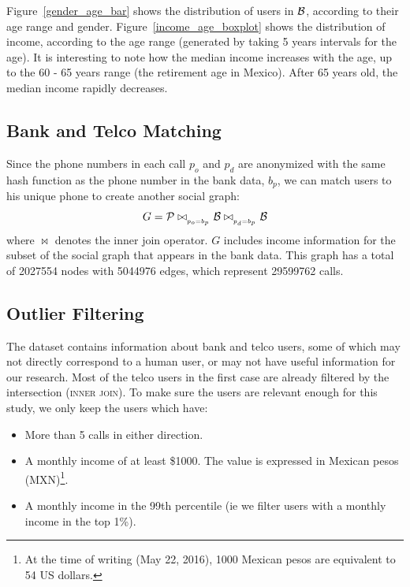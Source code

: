 Figure~\ref{gender_age_bar} shows the distribution of users in $\mathcal{B}$, according to
their age range and gender.
Figure~\ref{income_age_boxplot} shows the distribution of income, according to the age range (generated by taking 5 years intervals for the age).
It is interesting to note how the median income increases with the age, up to 
the 60 - 65 years range (the retirement age in Mexico). After 65 years old, the median income rapidly decreases.


\subsection{Bank and Telco Matching}

Since the phone numbers in each call $ p_o $ and $ p_d $ are anonymized with the same hash function as the phone number in the bank data, $ b_p $, we can match users to his unique phone to create another social graph: 
$$ G = \mathcal{P} \bowtie_{_{p_o = b_p}} \mathcal{B} \bowtie_{_{p_d = b_p}} \mathcal{B} $$ 
where $\bowtie$ denotes the inner join operator.
$G$ includes income information for the subset of the social graph that appears in the bank data.
This graph has a total of \num{2027554} nodes with \num{5044976} edges, which represent \num{29599762} calls. %

\subsection{Outlier Filtering}

The dataset contains information about bank and telco users, some of which may not directly correspond to a human user, %
or may not have useful information for our research. 
Most of the telco users in the first case are already filtered by the intersection (\textsc{inner join}). To make sure the users are relevant enough for this study, we only keep the users which have:

\begin{itemize}
	\item More than 5 calls in either direction.
	\item A monthly income of at least \$\num{1000}.
	The value is expressed in Mexican pesos (MXN)\footnote{At the time of writing (May 22, 2016), 1000 Mexican pesos are equivalent to 54 US dollars.}.
	\item A monthly income in the \num{99}th percentile (ie we filter users with a monthly income in the top 1\%).
\end{itemize}
